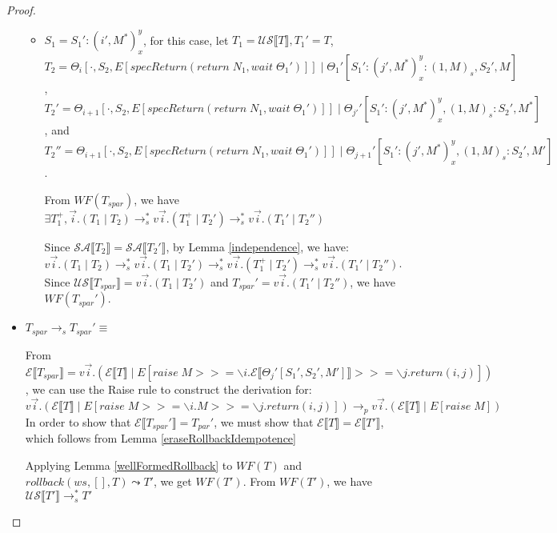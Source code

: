 \documentclass[9pt]{article}
\newcommand\specStep{\rightarrow_{s}}
\newcommand\parStep{\rightarrow_{p}}
\newcommand{\eval}[1]{E[#1]}
\newcommand{\erase}[1]{\mathcal{E}\llbracket #1 \rrbracket}
\newcommand{\unSpec}[1]{\mathcal{US} \llbracket #1 \rrbracket}
\newcommand{\specActions}[1]{\mathcal{SA} \llbracket #1 \rrbracket}
\begin{document}
\begin{proof}
\begin{itemize}
\begin{itemize}
\item $S_1 = S_1' : (i', M^*)_x^y$, for this case, let $T_1 = \unSpec{T}, T_1' = T$,\\
$T_2 = \Theta_i[\cdot, S_2, \eval{specReturn(return \; N_1, wait \; \Theta_1')}] \; | \; \Theta_1'[S_1' : (j', M^*)_x^y : (1, M)_s, S_2', M]$, \\
$T_2' = \Theta_{i+1}[\cdot, S_2, \eval{specReturn(return \; N_1, wait \; \Theta_1')}] \; | \; \Theta_{j'}'[S_1' : (j', M^*)_x^y, (1, M)_s : S_2', M^*]$, and  \\
$T_2'' = \Theta_{i+1}[\cdot, S_2, \eval{specReturn(return \; N_1, wait \; \Theta_1')}] \; | \; \Theta_{j+1}'[S_1' : (j', M^*)_x^y, (1, M)_s : S_2', M']$.  

From $WF(T_{spar})$, we have $\exists T_1^+, \vec{i}.(T_1 \; | \; T_2) \specStep^* v\vec{i}.(T_1^+ \; | \; T_2') \specStep^* v\vec{i}.(T_1' \; | \; T_2'')$

Since $\specActions{T_2} = \specActions{T_2'}$, by Lemma \ref{independence}, we have: 
$v\vec{i}.(T_1 \; | \; T_2) \specStep^* v\vec{i}.(T_1 \; | \; T_2') \specStep^* v\vec{i}.(T_1^+ \; | \; T_2') \specStep^* v\vec{i}.(T_1' \; | \; T_2'')$.  Since $\unSpec{T_{spar}} = v\vec{i}.(T_1 \; | \; T_2')$ and $T_{spar}' = v\vec{i}.(T_1' \; | \; T_2'')$, we have $WF(T_{spar}')$.  

\end{itemize}

\item $T_{spar} \specStep T_{spar}' \equiv $


From $\erase{T_{spar}} = v\vec{i}.(\erase{T} \; | \; \eval{raise \; M >>= \backslash i. \erase{\Theta_j'[S_1', S_2', M']} >>= \backslash j. return(i, j)})$, we can use the Raise rule to construct the derivation for:
$v\vec{i}.(\erase{T} \; | \; \eval{raise \; M >>= \backslash i. M >>= \backslash j. return(i, j)}) \parStep v\vec{i}.(\erase{T} \; | \; \eval{raise \; M})$ In order to show that $\erase{T_{spar}'} = T_{par}'$, we must show that $\erase{T} = \erase{T'}$, which follows from Lemma \ref{eraseRollbackIdempotence}


Applying Lemma \ref{wellFormedRollback} to $WF(T)$ and $rollback(ws, [], T) \leadsto T'$, we get $WF(T')$.  From $WF(T')$, we have $\unSpec{T'} \specStep^* T'$

\end{itemize}
\end{proof}
\end{document}
